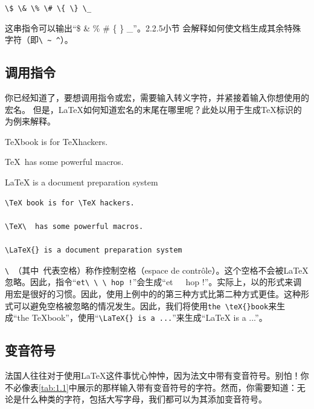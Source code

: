 \begin{dmd}
    \verb+\$ \& \% \# \{ \} \_+
\end{dmd}

这串指令可以输出“\$ \& \% \# \{ \} \_”。2.2.5小节%
会解释如何使文档生成其余特殊字符（即\verb+\ ~ ^+）。

\subsection{调用指令}

你已经知道了，要想调用指令或宏，需要输入转义字符，并紧接着输入你想使用的宏名。%
但是，\LaTeX 如何知道宏名的末尾在哪里呢？此处以用于生成\TeX 标识的为例来解释。

\begin{codelist}{
    \TeX book is for \TeX hackers.

    \TeX\  has some powerful macros.

    \LaTeX{} is a document preparation system
}\begin{verbatim}\TeX book is for \TeX hackers.

\TeX\  has some powerful macros.

\LaTeX{} is a document preparation system
    \end{verbatim}
\end{codelist}

\begin{exclamation}
    \verb*|\ |（其中\verb*| |代表空格）称作控制空格（espace de contrôle）。这个空格不会被\LaTeX 忽略。因此，指令“\verb*|et\ \ \ hop !|”会生成“et\ \ \ hop !”。实际上，以\dm{\backslash}\dm{\{}\dm{\}}的形式来调用宏是很好的习惯。因此，使用上例中的的第三种方式比第二种方式更佳。这种形式可以避免空格被忽略的情况发生。因此，我们将使用\verb|the \teX{}book|来生成“the \TeX{}book”，使用“\verb*|\LaTeX{} is a ...|”来生成“\LaTeX{} is a ...”。
\end{exclamation}

\subsection{变音符号}

法国人往往对于使用\LaTeX 这件事忧心忡忡，因为法文中带有变音符号。别怕！你不必像表\ref{tab:1.1}中展示的那样输入带有变音符号的字符。然而，你需要知道：无论是什么种类的字符，包括大写字母，我们都可以为其添加变音符号。

